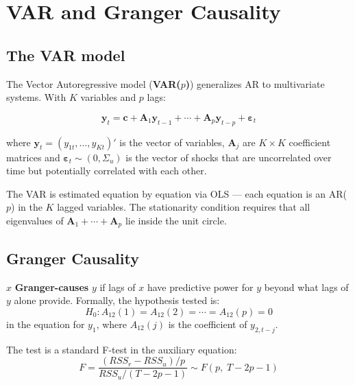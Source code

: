 \chapter{VAR and Granger Causality}
\label{cap:var}

\section{The VAR model}

The Vector Autoregressive model (\textbf{VAR($p$)}) generalizes AR to
multivariate systems. With $K$ variables and $p$ lags:

\[
  \mathbf{y}_t = \mathbf{c} + \mathbf{A}_1 \mathbf{y}_{t-1}
                 + \cdots + \mathbf{A}_p \mathbf{y}_{t-p}
                 + \boldsymbol{\varepsilon}_t
\]

where $\mathbf{y}_t = (y_{1t}, \ldots, y_{Kt})'$ is the vector of variables,
$\mathbf{A}_j$ are $K \times K$ coefficient matrices and
$\boldsymbol{\varepsilon}_t \sim (0, \Sigma_u)$ is the vector of shocks that are
uncorrelated over time but potentially correlated with each other.

The VAR is estimated equation by equation via OLS --- each equation is an AR($p$)
in the $K$ lagged variables. The stationarity condition requires that all
eigenvalues of $\mathbf{A}_1 + \cdots + \mathbf{A}_p$ lie inside the
unit circle.

\section{Granger Causality}

$x$ \textbf{Granger-causes} $y$ if lags of $x$ have predictive power
for $y$ beyond what lags of $y$ alone provide. Formally, the hypothesis tested is:
\[
  H_0: A_{12}(1) = A_{12}(2) = \cdots = A_{12}(p) = 0
\]
in the equation for $y_1$, where $A_{12}(j)$ is the coefficient of $y_{2,t-j}$.

The test is a standard F-test in the auxiliary equation:
\[
  F = \frac{(RSS_r - RSS_u)/p}{RSS_u / (T - 2p - 1)} \sim F(p,\; T-2p-1)
\]

